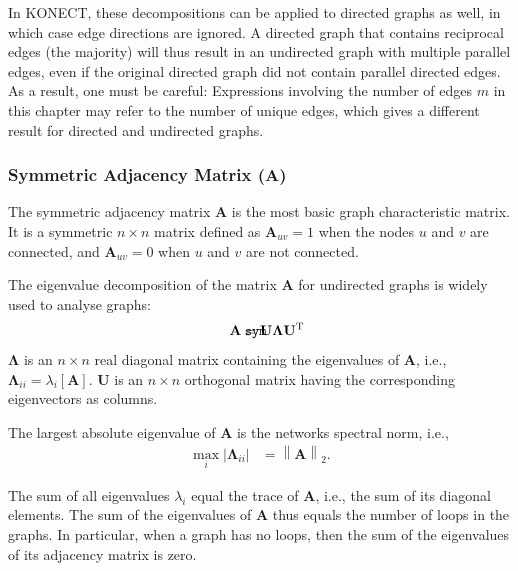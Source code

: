 \documentclass{article}
\def\mathnote#1{%
  \tag*{\rlap{\hspace\marginparsep\smash{\parbox[t]{\marginparwidth}{#1}}}}
}
\begin{document}
In KONECT, these decompositions can be applied to directed graphs as well, in
which case edge directions are ignored.  A directed graph that contains
reciprocal edges (the majority) will thus result in an undirected graph
with multiple parallel edges, even if the original directed graph did
not contain parallel directed edges.  As a result, one must be careful:
Expressions involving the number of edges $m$ in this chapter may refer
to the number of unique edges, which gives a different result for
directed and undirected graphs.  

\subsubsection{Symmetric Adjacency Matrix ($\mathbf A$)}
The symmetric adjacency matrix $\mathbf A$ is the most basic graph
characteristic matrix.  It is a symmetric $n \times n$ matrix defined as
$\mathbf A_{uv}=1$ when the nodes $u$ and $v$ are connected, and
$\mathbf A_{uv}=0$ when $u$ and $v$ are not connected. 

The eigenvalue decomposition of the matrix $\mathbf A$ for undirected
graphs is widely used to analyse graphs: 
\begin{align}
  \mathnote{\texttt{sym}}
  \mathbf A &= \mathbf U \mathbf \Lambda \mathbf U^{\mathrm T}
\end{align}
$\mathbf \Lambda$ is an $n \times n$ real diagonal matrix containing the
eigenvalues of $\mathbf A$, i.e., $\mathbf \Lambda_{ii} =
\lambda_i[\mathbf A]$.  
$\mathbf U$ is an $n \times n$ orthogonal matrix having the
corresponding eigenvectors as columns. 

The largest absolute eigenvalue of $\mathbf A$ is the networks spectral norm,
i.e.,
\begin{align*}
  \max_i |\mathbf \Lambda_{ii}| &= \left\| \mathbf A \right\|_2.
\end{align*}

The sum of all eigenvalues $\lambda_i$ equal the trace of $\mathbf A$,
i.e., the sum of its diagonal elements.  The sum of the eigenvalues of
$\mathbf A$ thus equals the number of loops in the graphs. 
In particular, when a graph
has no loops, then the sum of the eigenvalues of its adjacency matrix is
zero.  
\end{document}
